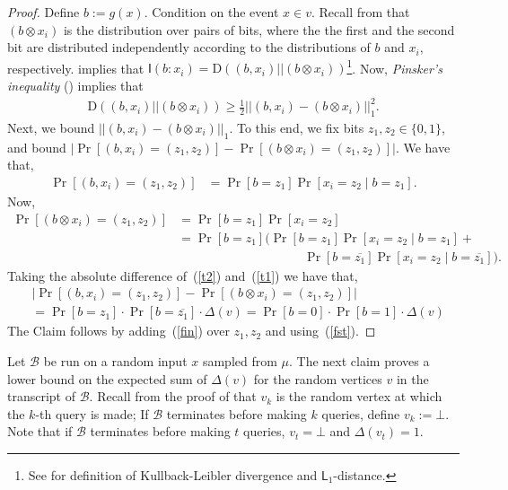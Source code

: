 \documentclass{toc}
\newcommand{\Div}{\text{D}}
\newcommand{\clB}{\mathcal{B}}
\newcommand{\I}{\mathsf{I}}
\begin{document}
\begin{proof}
  Define $b:=g(x)$. Condition on the event $x \in v$. Recall from  that $(b \otimes x_i)$
   is the distribution over pairs of bits, where
the %
the first and the second bit are %
 distributed independently according to the distributions of $b$ and $x_i$,
respectively.  %
%
  implies that $\I(b : x_i)=\Div((b,x_i) || (b \otimes x_i))$\footnote{See  for definition of Kullback-Leibler divergence and $\mathsf{L}_1$-distance.}. Now, \emph{Pinsker's inequality} () implies that 
\begin{align}
\label{fst}\Div((b,x_i) || (b \otimes x_i)) \geq \frac{1}{2} ||(b,x_i)-(b \otimes x_i)||^2_1.
\end{align}
Next, we bound $||(b,x_i)-(b \otimes x_i)||_1$. To this end, we fix bits $z_1, z_2 \in \{0,1\}$, and bound $|\Pr[(b,x_i)=(z_1,z_2)]-\Pr[(b \otimes x_i)=(z_1,z_2)]|$. We have that,
\begin{align}
\label{t1} \Pr[(b,x_i)=(z_1,z_2)]&=\Pr[b=z_1]\Pr[x_i=z_2 \mid b = z_1].
\end{align}
Now,
\begin{align}
\label{t2} \Pr[(b \otimes x_i)=(z_1,z_2)]&=\Pr[b=z_1]\Pr[x_i=z_2] \nonumber \\
&=\Pr[b=z_1](\Pr[b=z_1]\Pr[x_i=z_2 \mid b=z_1]+&\nonumber \\
& \qquad \qquad \qquad \qquad \qquad \Pr[b=\overline{z_1}]\Pr[x_i=z_2 \mid b=\overline{z_1}]).
\end{align}
Taking the absolute difference of~(\ref{t2}) and~(\ref{t1}) we have that,
\begin{align}
&|\Pr[(b,x_i)=(z_1,z_2)]-\Pr[(b \otimes x_i)=(z_1,z_2)]| \nonumber \\
&=\Pr[b=z_1] \cdot \Pr[b=\overline{z_1}] \cdot \Delta(v)=\Pr[b=0] \cdot \Pr[b=1] \cdot \Delta(v)\label{fin}
\end{align}
The Claim follows by adding~(\ref{fin}) over $z_1, z_2$ and using~(\ref{fst}).
\end{proof}
Let  $\clB$ be run on a random input $x$ sampled from $\mu$. The next claim proves a lower bound on the expected sum of $\Delta(v)$ for the random vertices $v$ in the transcript of $\clB$. Recall from the proof of 
that $v_k$ is the random vertex at which the $k$-th query is made; If $\clB$ terminates before making $k$ queries, define $v_k:=\bot$. Note that if $\clB$ terminates before making $t$ queries, $v_t=\bot$ and $\Delta(v_t)=1$.
\end{document}
